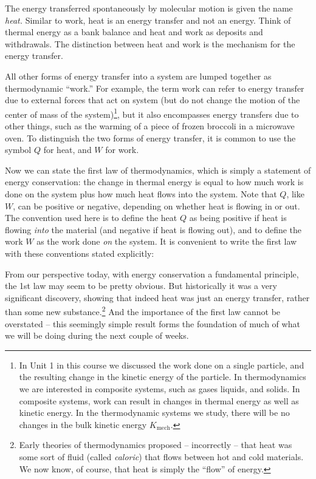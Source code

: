 The energy transferred spontaneously by molecular motion is given the
name \textit{heat.}  Similar to work, heat is an energy transfer and not
an energy.  Think of thermal energy as a bank balance and heat and work
as deposits and withdrawals.  The distinction between heat and
work is the mechanism for the energy transfer.


 All other forms of energy transfer into a system are lumped 
together as thermodynamic ``work.''  For example, the term work can refer 
to energy transfer due to external forces that act on system (but do not 
change the motion of the center of mass of the system)\footnote{In Unit 1 
in this course we discussed the work done on a single particle,
and the resulting change in the kinetic energy of the particle.
In thermodynamics we are interested in composite systems, such as gases
liquids, and solids.  In composite systems, work can result in changes in
thermal energy as well as kinetic energy. In the thermodynamic systems
we study, there will be no changes in the bulk kinetic energy 
$K_\text{mech}$.}, but it also 
encompasses energy transfers due to other things, such as the warming of 
a piece of frozen broccoli in a microwave oven.  To distinguish the 
two forms of energy transfer, it is common to use the symbol $Q$ for heat, 
and $W$ for work.

Now we can state the first law of thermodynamics, which is simply a
statement of energy conservation: the change in thermal energy is
equal to how much work is done on the system plus how much heat flows
into the system.
Note that $Q$, like $W$, can be positive or negative, depending on
whether heat is flowing in or out.  The convention used here is to
define the heat $Q$ as being positive if heat is flowing \emph{into}
the material (and negative if heat is flowing out), and to define
the work $W$ as the work done \emph{on} the system.  
It is convenient to write the first law with these conventions stated
explicitly:


 From our perspective today, with energy conservation a fundamental
principle, the 1st law may seem to be pretty obvious.  But historically it was a
very significant discovery, showing that indeed heat was just an
energy transfer, rather than some new substance.\footnote{Early theories of
thermodynamics proposed -- incorrectly -- that heat was some sort of
fluid (called \emph{caloric}) that flows between hot and cold materials.
We now know, of course, that heat is simply the ``flow'' of energy.}
And the
importance of the first law cannot be overstated -- this seemingly simple
result forms the foundation of much of what we will be doing during
the next couple of weeks.


